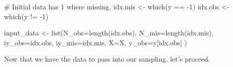 \documentclass[
  letterpaper,
  DIV=11,
  numbers=noendperiod]{scrreprt}
\newenvironment{Shaded}{\begin{snugshade}}{\end{snugshade}}
\newcommand{\AttributeTok}[1]{\textcolor[rgb]{0.40,0.45,0.13}{#1}}
\newcommand{\CommentTok}[1]{\textcolor[rgb]{0.37,0.37,0.37}{#1}}
\newcommand{\DecValTok}[1]{\textcolor[rgb]{0.68,0.00,0.00}{#1}}
\newcommand{\FunctionTok}[1]{\textcolor[rgb]{0.28,0.35,0.67}{#1}}
\newcommand{\NormalTok}[1]{\textcolor[rgb]{0.00,0.23,0.31}{#1}}
\newcommand{\OtherTok}[1]{\textcolor[rgb]{0.00,0.23,0.31}{#1}}
\newcommand{\SpecialCharTok}[1]{\textcolor[rgb]{0.37,0.37,0.37}{#1}}
\begin{document}
\begin{Shaded}
\begin{Highlighting}[]
\CommentTok{\# Initial data has \textasciigrave{}{-}1\textasciigrave{} where missing.}
\NormalTok{idx.mis }\OtherTok{\textless{}{-}} \FunctionTok{which}\NormalTok{(y }\SpecialCharTok{==} \SpecialCharTok{{-}}\DecValTok{1}\NormalTok{)}
\NormalTok{idx.obs }\OtherTok{\textless{}{-}} \FunctionTok{which}\NormalTok{(y }\SpecialCharTok{!=} \SpecialCharTok{{-}}\DecValTok{1}\NormalTok{)}

\NormalTok{input\_data }\OtherTok{\textless{}{-}} \FunctionTok{list}\NormalTok{(}\AttributeTok{N\_obs=}\FunctionTok{length}\NormalTok{(idx.obs), }\AttributeTok{N\_mis=}\FunctionTok{length}\NormalTok{(idx.mis),}
                  \AttributeTok{iy\_obs=}\NormalTok{idx.obs, }\AttributeTok{iy\_mis=}\NormalTok{idx.mis,}
                  \AttributeTok{X=}\NormalTok{X,}
                  \AttributeTok{y\_obs=}\NormalTok{y[idx.obs]}
\NormalTok{)}
\end{Highlighting}
\end{Shaded}

Now that we have the data to pass into our sampling, let's proceed.

\begin{Shaded}
\end{Shaded}

\begin{Shaded}
\end{Shaded}
\end{document}
